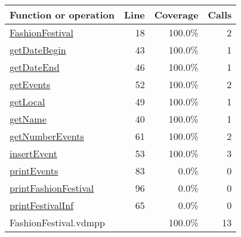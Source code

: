 \begin{longtable}{|l|r|r|r|}
\hline
Function or operation & Line & Coverage & Calls \\
\hline
\hline
\hyperref[FashionFestival:18]{FashionFestival} & 18&100.0\% & 2 \\
\hline
\hyperref[getDateBegin:43]{getDateBegin} & 43&100.0\% & 1 \\
\hline
\hyperref[getDateEnd:46]{getDateEnd} & 46&100.0\% & 1 \\
\hline
\hyperref[getEvents:52]{getEvents} & 52&100.0\% & 2 \\
\hline
\hyperref[getLocal:49]{getLocal} & 49&100.0\% & 1 \\
\hline
\hyperref[getName:40]{getName} & 40&100.0\% & 1 \\
\hline
\hyperref[getNumberEvents:61]{getNumberEvents} & 61&100.0\% & 2 \\
\hline
\hyperref[insertEvent:53]{insertEvent} & 53&100.0\% & 3 \\
\hline
\hyperref[printEvents:83]{printEvents} & 83&0.0\% & 0 \\
\hline
\hyperref[printFashionFestival:96]{printFashionFestival} & 96&0.0\% & 0 \\
\hline
\hyperref[printFestivalInf:65]{printFestivalInf} & 65&0.0\% & 0 \\
\hline
\hline
FashionFestival.vdmpp & & 100.0\% & 13 \\
\hline
\end{longtable}

